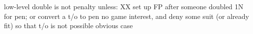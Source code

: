low-level double is not penalty unless:
XX set up FP
after someone doubled 1N for pen; or convert a t/o to pen
no game interest, and deny some suit (or already fit) so that t/o is not possible
obvious case